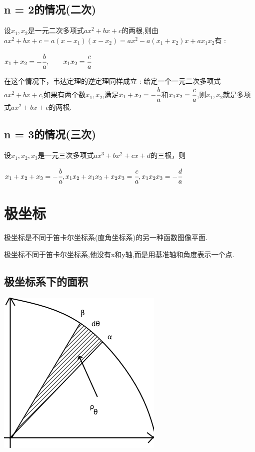 {{\subsection{n = 2的情况(二次)}{
    设$x_1,x_2$是一元二次多项式$ax^2 + bx + c$的两根,则由$ax^2 +bx + c = a(x - x_1)(x - x_2) = ax^2 - a(x_1 + x_2)x + ax_1x_2$有 :

    $x_1 + x_2 = -\cfrac{b}{a},\qquad x_1x_2 = \cfrac{c}{a}$

    在这个情况下，韦达定理的逆定理同样成立 : 给定一个一元二次多项式$ax^2 + bx + c$,如果有两个数$x_1,x_2$,满足$x_1 + x_2 = -\cfrac{b}{a}$和$x_1x_2 = \cfrac{c}{a}$,则$x_1,x_2$就是多项式$ax^2 + bx + c$的两根.
}%

\subsection{n = 3的情况(三次)}{
    设$x_1,x_2,x_3$是一元三次多项式$ax^3 + bx^2 + cx + d$的三根，则

    $x_1 + x_2 + x_3 = -\cfrac{b}{a}, x_1x_2 + x_1x_3 + x_2x_3 = \cfrac{c}{a},x_1x_2x_3 = -\cfrac{d}{a}$
}%

}%

\section{极坐标}{
极坐标是不同于笛卡尔坐标系(直角坐标系)的另一种函数图像平面.

极坐标不同于笛卡尔坐标系,他没有x和y轴,而是用基准轴和角度表示一个点.

\subsection{极坐标系下的面积}{
    \begin{center}
        \includegraphics{resources/polar_coordness.png}
    \end{center}

}}}
